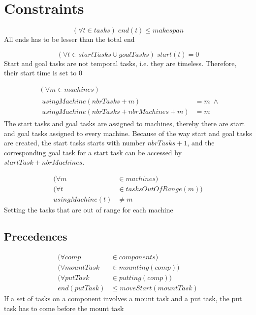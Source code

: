 \documentclass[10pt,a4paper]{report}
\begin{document}
\section{Constraints}

\begin{equation}\label{eq:92}
(\forall t \in tasks) \; end(t) \le makespan
\end{equation}
All ends has to be lesser than the total end

\begin{equation}\label{eq:93}
(\forall t \in startTasks \cup goalTasks) \; start(t) = 0
\end{equation}
Start and goal tasks are not temporal tasks, i.e. they are timeless. Therefore, their start time is set to 0


\begin{equation}
\begin{aligned}\label{eq:94}
&(\forall m \in machines) \\
&\begin{aligned}
usingMachine(nbrTasks + m) &= m \; \land\\
usingMachine(nbrTasks + nbrMachines + m) &= m
\end{aligned}
\end{aligned}
\end{equation}
The start tasks and goal tasks are assigned to machines, thereby there are start and goal tasks assigned to every machine. Because of the way start and goal tasks are created, the start tasks starts with number $nbrTasks + 1$, and the corresponding goal task for a start task can be accessed by $startTask + nbrMachines$.

\begin{equation}\label{eq:95}
\begin{aligned}
(\forall m &\in machines) \\
(\forall t &\in tasksOutOfRange(m)) \\
usingMachine(t) &\neq m
\end{aligned}
\end{equation}
Setting the tasks that are out of range for each machine

\subsection{Precedences}

\begin{equation}
\begin{aligned}\label{eq:96}
(\forall comp &\in components) \\
(\forall mountTask &\in mounting(comp)) \\
(\forall putTask &\in putting(comp)) \\
end(putTask) &\le moveStart(mountTask)
\end{aligned}
\end{equation}
If a set of tasks on a component involves a mount task and a put task, the put task has to come before the mount task
\end{document}
